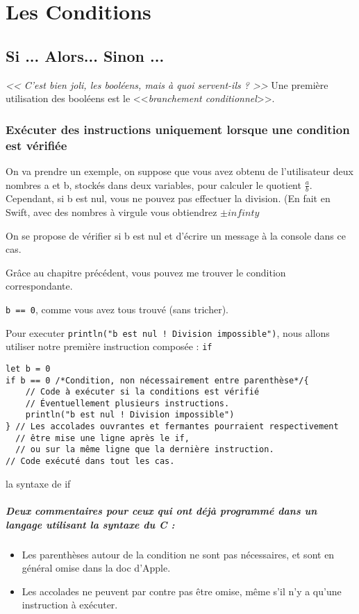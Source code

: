 \chapter{Les Conditions}
\section{Si ... Alors... Sinon ...}
\emph{<< C'est bien joli, les booléens, mais à quoi servent-ils ? >>}
Une première utilisation des booléens est le <<\emph{branchement conditionnel}>>.
\subsection{Exécuter des instructions uniquement lorsque une condition est vérifiée}
On va prendre un exemple, on suppose que vous avez obtenu de l'utilisateur deux nombres a et b, stockés dans deux variables, pour calculer le quotient $\frac{a}{b}$.
Cependant, si b est nul, vous ne pouvez pas effectuer la division. (En fait en Swift, avec des nombres à virgule vous obtiendrez $\pm infinty$

On se propose de vérifier si b est nul et d'écrire un message à la console dans ce cas.

Grâce au chapitre précédent, vous pouvez me trouver le condition correspondante.

\pagebreak %
\texttt{b == 0}, comme vous avez tous trouvé (sans tricher).

Pour executer \texttt{println("b est nul ! Division impossible")}, nous allons utiliser notre première instruction composée : \texttt{if}

\begin{listing}[h]
\begin{verbatim}
let b = 0
if b == 0 /*Condition, non nécessairement entre parenthèse*/{
    // Code à exécuter si la conditions est vérifié
    // Éventuellement plusieurs instructions.
    println("b est nul ! Division impossible")
} // Les accolades ouvrantes et fermantes pourraient respectivement
  // être mise une ligne après le if,
  // ou sur la même ligne que la dernière instruction.
// Code exécuté dans tout les cas.
\end{verbatim}
\caption{la syntaxe de if}
\end{listing}
\paragraph{Deux commentaires pour ceux qui ont déjà programmé
dans un langage utilisant la syntaxe du C :}
\begin{itemize}
\item Les parenthèses autour de la condition ne sont pas nécessaires,
et sont en général omise dans la doc d'Apple.
\item Les accolades ne peuvent par contre pas être omise,
même s'il n'y a qu'une instruction à exécuter.
\end{itemize}
